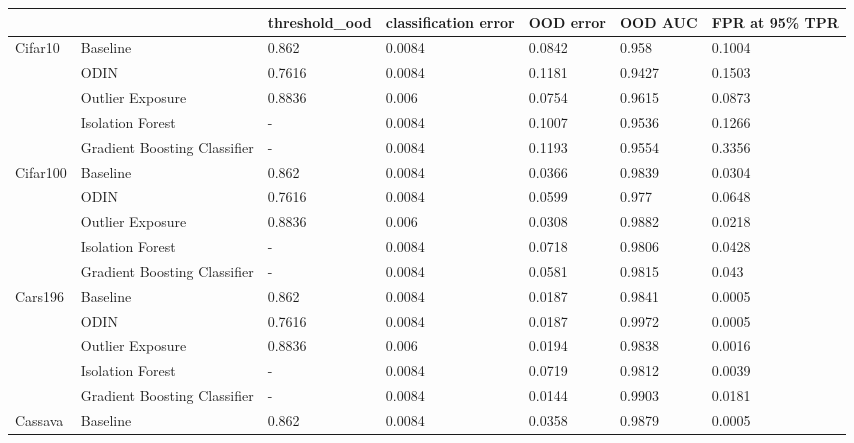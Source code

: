 \begin{tabular}{lllllll}
\toprule
            &                              & threshold\_ood & classification error & OOD error & OOD AUC & FPR at 95\% TPR \\
\midrule
Cifar10 & Baseline &         0.862 &               0.0084 &    0.0842 &   0.958 &         0.1004 \\
            & ODIN &        0.7616 &               0.0084 &    0.1181 &  0.9427 &         0.1503 \\
            & Outlier Exposure &        0.8836 &                0.006 &    0.0754 &  0.9615 &         0.0873 \\
            & Isolation Forest &             - &               0.0084 &    0.1007 &  0.9536 &         0.1266 \\
            & Gradient Boosting Classifier &             - &               0.0084 &    0.1193 &  0.9554 &         0.3356 \\
Cifar100 & Baseline &         0.862 &               0.0084 &    0.0366 &  0.9839 &         0.0304 \\
            & ODIN &        0.7616 &               0.0084 &    0.0599 &   0.977 &         0.0648 \\
            & Outlier Exposure &        0.8836 &                0.006 &    0.0308 &  0.9882 &         0.0218 \\
            & Isolation Forest &             - &               0.0084 &    0.0718 &  0.9806 &         0.0428 \\
            & Gradient Boosting Classifier &             - &               0.0084 &    0.0581 &  0.9815 &          0.043 \\
Cars196 & Baseline &         0.862 &               0.0084 &    0.0187 &  0.9841 &         0.0005 \\
            & ODIN &        0.7616 &               0.0084 &    0.0187 &  0.9972 &         0.0005 \\
            & Outlier Exposure &        0.8836 &                0.006 &    0.0194 &  0.9838 &         0.0016 \\
            & Isolation Forest &             - &               0.0084 &    0.0719 &  0.9812 &         0.0039 \\
            & Gradient Boosting Classifier &             - &               0.0084 &    0.0144 &  0.9903 &         0.0181 \\
Cassava & Baseline &         0.862 &               0.0084 &    0.0358 &  0.9879 &         0.0005 \\

\end{tabular}
